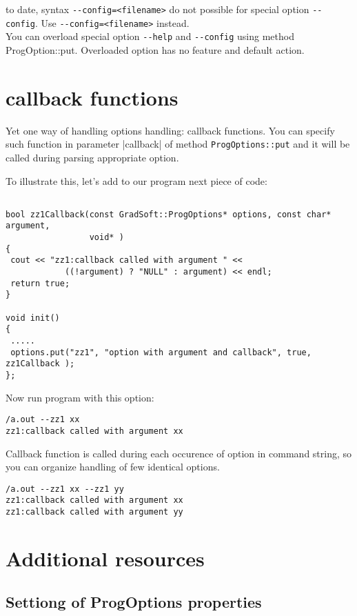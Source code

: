 \documentclass[10pt]{article}
\begin{document}
 to date, syntax \verb|--config=<filename>| do not possible
for special option \verb|--config|. Use \verb|--config=<filename>| instead. \\

You can overload special option \verb|--help| and \verb|--config|
using method ProgOption::put. Overloaded option has no feature and default action.


\section{ callback functions  }

 Yet one way of handling options handling: callback functions. You can specify
 such function in parameter |callback| of method \verb|ProgOptions::put| and
 it will be called during parsing appropriate option.

 To illustrate this, let's add to our program next piece of code:

\begin{verbatim}

bool zz1Callback(const GradSoft::ProgOptions* options, const char* argument,
                 void* )
{
 cout << "zz1:callback called with argument " << 
            ((!argument) ? "NULL" : argument) << endl;
 return true;
}

void init()
{
 .....
 options.put("zz1", "option with argument and callback", true, zz1Callback );
};

\end{verbatim}

 Now run program with this option:

\begin{verbatim}
/a.out --zz1 xx
zz1:callback called with argument xx
\end{verbatim}

 Callback function is called during each occurence of option in command string,
 so you can organize handling of few identical options.

\begin{verbatim}
/a.out --zz1 xx --zz1 yy
zz1:callback called with argument xx
zz1:callback called with argument yy
\end{verbatim}


\section{ Additional resources }

\subsection{ Settiong of ProgOptions properties }
\end{document}

